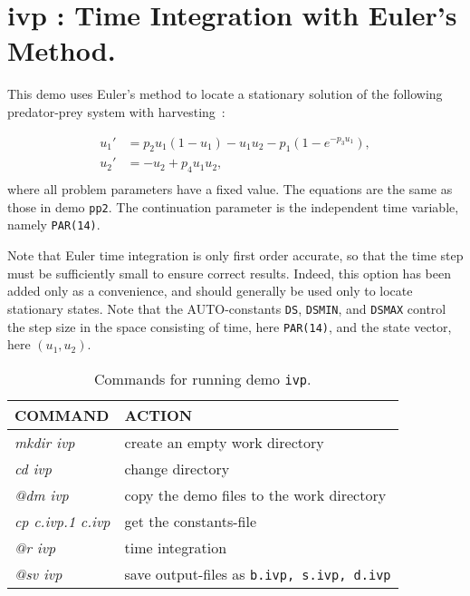 \documentclass[12pt]{report}
\begin{document}
\newpage
\section{ ivp :  Time Integration with Euler's Method.} \label{sec:Demos_ivp}
This demo uses Euler's method to locate a stationary solution of the
following predator-prey system with harvesting~:

\begin{equation} \begin{array}{cl}
  u_1 ' &= p_2 u_1 (1 - u_1 ) - u_1 u_2 - p_1 (1-e^{-p_3 u_1}) ,\\
  u_2 ' &= -u_2  + p_4 u_1 u_2  ,\\\end{array} \end{equation}
where all problem parameters have a fixed value.
The equations are the same as those in demo {\tt pp2}.
The continuation parameter is the independent time variable, namely {\tt PAR(14)}.

Note that Euler time integration is only first order accurate, so that
the time step must be sufficiently small to ensure correct results.
Indeed, this option has been added only as a convenience, and should 
generally be used only to locate stationary states.
Note that the {\cal AUTO}-constants {\tt DS}, {\tt DSMIN}, and {\tt DSMAX}
control the step size
in the space consisting of time, here {\tt PAR(14)}, and the state vector,
here $(u_1,u_2)$.

\begin{table}[htbp]
\begin{center}
\begin{tabular}{| l | l |}
\hline
  COMMAND  & ACTION \\
\hline
  {\it mkdir ivp} & create an empty work directory \\ 
  {\it cd ivp} & change directory \\
  {\it @dm ivp} & copy the demo files to the work directory \\
\hline
  {\it cp c.ivp.1 c.ivp} & get the constants-file \\ 
  {\it @r ivp} & time integration \\ 
  {\it @sv ivp} & save output-files as {\tt b.ivp, s.ivp, d.ivp} \\ 
\hline
\end{tabular}
\caption{Commands for running demo {\tt ivp}.}
\label{tbl:demo_ivp}
\end{center}
\end{table}
\end{document}
